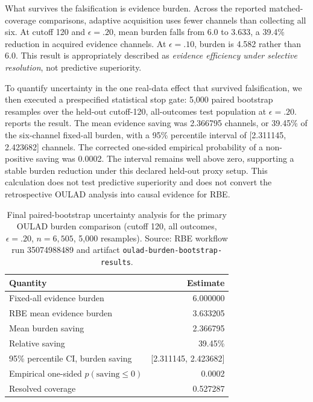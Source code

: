 \documentclass[11pt]{article}
\begin{document}
What survives the falsification is evidence burden. Across the reported matched-coverage comparisons, adaptive acquisition uses fewer channels than collecting all six. At cutoff 120 and $\epsilon=.20$, mean burden falls from 6.0 to 3.633, a 39.4\% reduction in acquired evidence channels. At $\epsilon=.10$, burden is 4.582 rather than 6.0. This result is appropriately described as \emph{evidence efficiency under selective resolution}, not predictive superiority.

To quantify uncertainty in the one real-data effect that survived falsification, we then executed a prespecified statistical stop gate: 5,000 paired bootstrap resamples over the held-out cutoff-120, all-outcomes test population at $\epsilon=.20$.  reports the result. The mean evidence saving was 2.366795 channels, or 39.45\% of the six-channel fixed-all burden, with a 95\% percentile interval of [2.311145, 2.423682] channels. The corrected one-sided empirical probability of a non-positive saving was 0.0002. The interval remains well above zero, supporting a stable burden reduction under this declared held-out proxy setup. This calculation does not test predictive superiority and does not convert the retrospective OULAD analysis into causal evidence for RBE.

\begin{table}[t]
\centering
\caption{Final paired-bootstrap uncertainty analysis for the primary OULAD burden comparison (cutoff 120, all outcomes, $\epsilon=.20$, $n=6{,}505$, 5,000 resamples). Source: RBE workflow run 35074988489 and artifact \texttt{oulad-burden-bootstrap-results}.}
\label{tab:bootstrap}
\small
\begin{tabular}{lr}
\toprule
Quantity & Estimate \\
\midrule
Fixed-all evidence burden & 6.000000 \\
RBE mean evidence burden & 3.633205 \\
Mean burden saving & 2.366795 \\
Relative saving & 39.45\% \\
95\% percentile CI, burden saving & [2.311145, 2.423682] \\
Empirical one-sided $p(\text{saving}\le 0)$ & 0.0002 \\
Resolved coverage & 0.527287 \\
\bottomrule
\end{tabular}
\end{table}
\end{document}
